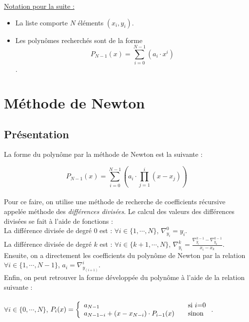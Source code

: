 \documentclass{report}
\begin{document}
    \underline{Notation pour la suite :}
    \vspace{0.1 cm}
    \begin{itemize}
      \item{La liste comporte $N$ éléments $(x_{i},y_{i})$.}
      \item{Les polynômes recherchés sont de la forme \[P_{N-1}(x)= \sum_{i=0}^{N-1} (a_{i} \cdot x^{i})\].}
    \end{itemize}
    \section{Méthode de Newton}
      \subsection{Présentation}
	\noindent La forme du polynôme par la méthode de Newton est la suivante : 
    	
    	\[P_{N-1}(x)= \sum_{i=0}^{N-1} \left( a_{i} \cdot \prod_{j=1}^{i} (x-x_{j}) \right)\] \\
	Pour ce faire, on utilise une méthode de recherche de coefficients récursive appelée méthode des \textit{différences divisées}. Le calcul des valeurs des différences divisées se fait à l'aide de fonctions : \\
    	
    	\noindent La différence divisée de degré $0$ est : $\forall i \in \{1, \cdots, N\}$, \indent $\nabla^{0}_{y_{i}} = y_{i}$.\\
    	 
	\noindent La différence divisée de degré $k$ est : $\forall i \in \{k+1,\cdots,N\}$, \indent $\nabla^{k}_{y_{i}} = \frac{\nabla^{k-1}_{y_{i}}-\nabla^{k-1}_{y_{k}}}{x_{i}-x_{k}}$.\\
    	 
    	\noindent Ensuite, on a directement les coefficients du polynôme de Newton par la relation\\
    	$ \forall i \in \{1, \cdots, N-1\}$, \indent $a_{i} = \nabla^{i}_{y_{(i+1)}}$.\\
    	 
    	\noindent Enfin, on peut retrouver la forme développée du polynôme à l'aide de la relation suivante :\\ \\
    	$\forall i \in \{0,\cdots,N\}$, \indent
    	$P_{i}(x) = \left\{
	\begin{array}{l l}
	  a_{N-1} & \quad \text{si $i$=0}\\
	  a_{N-1-i} + (x-x_{N-i}) \cdot P_{i-1}(x) & \quad \text{sinon}
	\end{array} \right. $.
      \newpage
\end{document}
